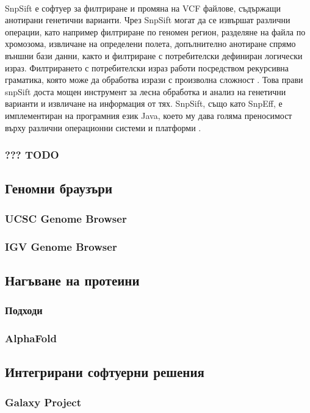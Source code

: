 \documentclass[pdftex,cyrillic,14pt,a4page,twoside]{extreport}
\begin{document}
\paragraph{}
SnpSift е софтуер за филтриране и промяна на VCF файлове, съдържащи анотирани генетични варианти. Чрез SnpSift могат да се извършат различни операции, като например филтриране по геномен регион, разделяне на файла по хромозома, извличане на определени полета, допълнително анотиране спрямо външни бази данни, както и филтриране с потребителски дефиниран логически израз. Филтрирането с потребителски израз работи посредством рекурсивна граматика, която може да обработва изрази с произволна сложност \cite{cingolani2012sift}. Това прави snpSift доста мощен инструмент за лесна обработка и анализ на генетични варианти и извличане на информация от тях. SnpSift, също като SnpEff, е имплементиран на програмния език Java, което му дава голяма преносимост върху различни операционни системи и платформи \cite[стр. 9-10]{schildt2020complete}.
\subsubsection{??? TODO}
\subsection{Геномни браузъри}
\subsubsection{UCSC Genome Browser}
\subsubsection{IGV Genome Browser}
\subsection{Нагъване на протеини}
\subsubsection{Подходи}
\subsubsection{AlphaFold}
\subsection{Интегрирани софтуерни решения}
\subsubsection{Galaxy Project}
\end{document}
